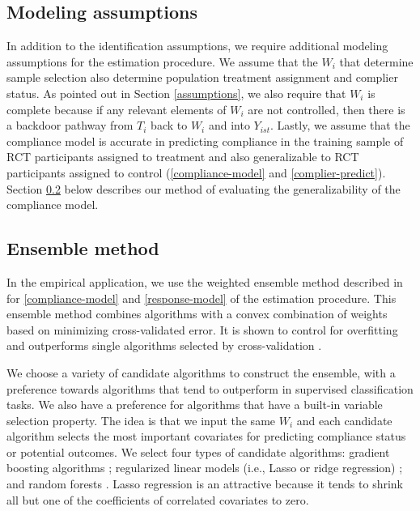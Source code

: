 \documentclass[hidelinks,12pt]{article}
\begin{document}
{{\subsection{Modeling assumptions}  \label{modeling-assumptions}
}
In addition to the identification assumptions, we require additional modeling assumptions for the estimation procedure. We assume that the $W_i$ that determine sample selection also determine population treatment assignment and complier status. As pointed out in Section \ref{assumptions}, we also require that $W_i$ is complete because if any relevant elements of $W_i$ are not controlled, then there is a backdoor pathway from $T_i$ back to $W_i$ and into $Y_{ist}$. Lastly, we assume that the compliance model is accurate in predicting compliance in the training sample of RCT participants assigned to treatment and also generalizable to RCT participants assigned to control (\ref{compliance-model} and \ref{complier-predict}). Section \ref{ensemble} below describes our method of evaluating the generalizability of the compliance model.

{\color{red}
\subsection{Ensemble method}  \label{ensemble}
}

In the empirical application, we use the weighted ensemble method described in \citet{van2007} for \ref{compliance-model} and \ref{response-model} of the estimation procedure. This ensemble method combines algorithms with a convex combination of weights based on minimizing cross-validated error. It is shown to control for overfitting and outperforms single algorithms selected by cross-validation \citep{polley2010super}. 

We choose a variety of candidate algorithms to construct the ensemble, with a preference towards algorithms that tend to outperform in supervised classification tasks. We also have a preference for algorithms that have a built-in variable selection property. The idea is that we input the same $W_i$ and each candidate algorithm selects the most important covariates for predicting compliance status or potential outcomes. We select four types of candidate algorithms: gradient boosting algorithms \citep{friedman2000additive,friedman2001greedy, friedman2002stochastic}; regularized linear models (i.e., Lasso or ridge regression) \citep{tibshirani2012strong}; and random forests \citep{breiman2001}. Lasso regression is an attractive because it tends to shrink all but one of the coefficients of correlated covariates to zero. 

}
\end{document}
